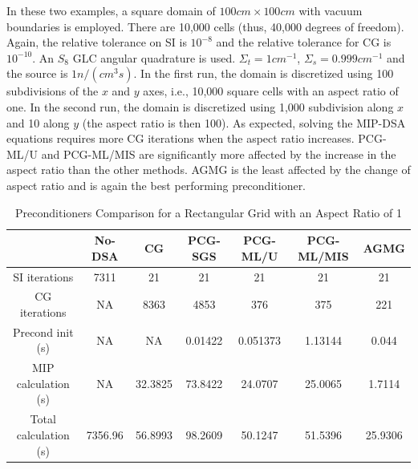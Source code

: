 \documentclass[preprint,10pt]{elsarticle}
\renewcommand{\(}{\left(}
\renewcommand{\)}{\right)}
\renewcommand{\[}{\left[}
\renewcommand{\]}{\right]}
\begin{document}
In these two examples, a square domain  of $100cm \times 100cm$ with vacuum boundaries
is employed. There are 10,000 cells (thus, 40,000 degrees of freedom). Again, the relative 
tolerance on SI is $10^{-8}$ and the relative tolerance for CG is $10^{-10}$. 
An $S_8$ GLC angular quadrature is used. $\Sigma_t = 1cm^{-1}$, $\Sigma_s = 0.999cm^{-1}$
and the source is $1n/(cm^3s)$. 
In the first run, the domain is discretized using 100 subdivisions of the $x$ and $y$
axes, i.e., 10,000 square cells with an aspect ratio of one. In the second run, 
the domain is discretized using 1,000 subdivision along $x$ and 10 along $y$ 
(the aspect ratio is then 100).
%
As expected, solving the MIP-DSA equations requires more CG iterations when the aspect
ratio increases. PCG-ML/U and PCG-ML/MIS are significantly more affected by the
increase in the aspect ratio than the other methods. AGMG is the least
affected by the change of aspect ratio and is again the best performing
preconditioner.
%
\begin{table}[!htbp]
  \caption{Preconditioners Comparison for a Rectangular Grid with an Aspect Ratio of 1}
  \begin{center}
    \begin{tabular}{|c|c|c|c|c|c|c|}
      \hline
       & No-DSA & CG & PCG-SGS & PCG-ML/U & PCG-ML/MIS & AGMG \\
      \hline
      SI iterations & 7311      & 21      & 21      & 21       & 21      & 21 \\
      CG iterations & NA        & 8363    & 4853    & 376      & 375     & 221\\
\hline
   Precond init (s) & NA        & NA      & 0.01422 & 0.051373 & 1.13144 &  0.044 \\
MIP calculation (s) & NA        & 32.3825 & 73.8422 & 24.0707  & 25.0065 & 1.7114 \\
Total calculation (s) & 7356.96 & 56.8993 & 98.2609 & 50.1247  & 51.5396 &25.9306 \\
      \hline
    \end{tabular}
    \label{table_ar_1}
  \end{center}
\end{table}
%
\end{document}
